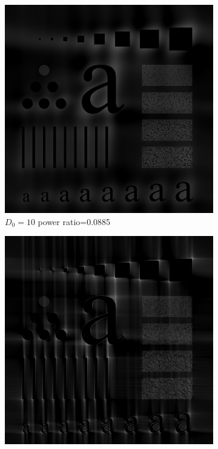 \begin{figure}[h!]
	\centering
	\begin{subfigure}[b]{0.3\linewidth}
		\includegraphics[width=\linewidth]{myfigure/p3/BHPF_10.png}
		\caption{$D_0=10$ power ratio=0.0885}
		\label{fig:BHPF_10}
	\end{subfigure}
  	\begin{subfigure}[b]{0.3\linewidth}
		\includegraphics[width=\linewidth]{myfigure/p3/BHPF_100.png}

\end{subfigure}
\end{figure}
